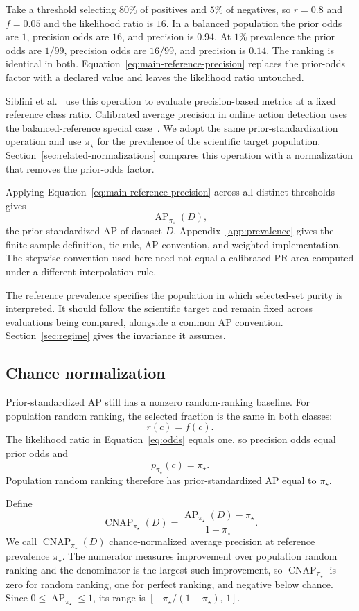 \documentclass[11pt]{article}
\newcommand{\AP}{\operatorname{AP}}
\newcommand{\CNAP}{\operatorname{CNAP}}
\newcommand{\Tpi}{\CNAP_{\pi_\star}}
\theoremstyle{remark}
\begin{document}
Take a threshold selecting $80\%$ of positives and $5\%$ of negatives, so $r=0.8$ and $f=0.05$ and the likelihood ratio is $16$. In a balanced population the prior odds are $1$, precision odds are $16$, and precision is $0.94$. At $1\%$ prevalence the prior odds are $1/99$, precision odds are $16/99$, and precision is $0.14$. The ranking is identical in both. Equation~\eqref{eq:main-reference-precision} replaces the prior-odds factor with a declared value and leaves the likelihood ratio untouched.

Siblini et al.~\cite{siblini2020calibration} use this operation to evaluate precision-based metrics at a fixed reference class ratio. Calibrated average precision in online action detection uses the balanced-reference special case~\cite{degeest2016online}. We adopt the same prior-standardization operation and use $\pi_\star$ for the prevalence of the scientific target population. Section~\ref{sec:related-normalizations} compares this operation with a normalization that removes the prior-odds factor.

Applying Equation~\eqref{eq:main-reference-precision} across all distinct thresholds gives
\[
\AP_{\pi_\star}(D),
\]
the prior-standardized AP of dataset $D$. Appendix~\ref{app:prevalence} gives the finite-sample definition, tie rule, AP convention, and weighted implementation. The stepwise convention used here need not equal a calibrated PR area computed under a different interpolation rule.

The reference prevalence specifies the population in which selected-set purity is interpreted. It should follow the scientific target and remain fixed across evaluations being compared, alongside a common AP convention. Section~\ref{sec:regime} gives the invariance it assumes.

\subsection{Chance normalization}

Prior-standardized AP still has a nonzero random-ranking baseline. For population random ranking, the selected fraction is the same in both classes:
\[
r(c)=f(c).
\]
The likelihood ratio in Equation~\eqref{eq:odds} equals one, so precision odds equal prior odds and
\[
p_{\pi_\star}(c)=\pi_\star.
\]
Population random ranking therefore has prior-standardized AP equal to $\pi_\star$.

Define
\begin{equation}
\Tpi(D)
=
\frac{\AP_{\pi_\star}(D)-\pi_\star}{1-\pi_\star}.
\label{eq:T}
\end{equation}
We call $\Tpi(D)$ chance-normalized average precision at reference prevalence $\pi_\star$. The numerator measures improvement over population random ranking and the denominator is the largest such improvement, so $\Tpi$ is zero for random ranking, one for perfect ranking, and negative below chance. Since $0\leq \AP_{\pi_\star}\leq 1$, its range is $[-\pi_\star/(1-\pi_\star),\,1]$.
\end{document}
